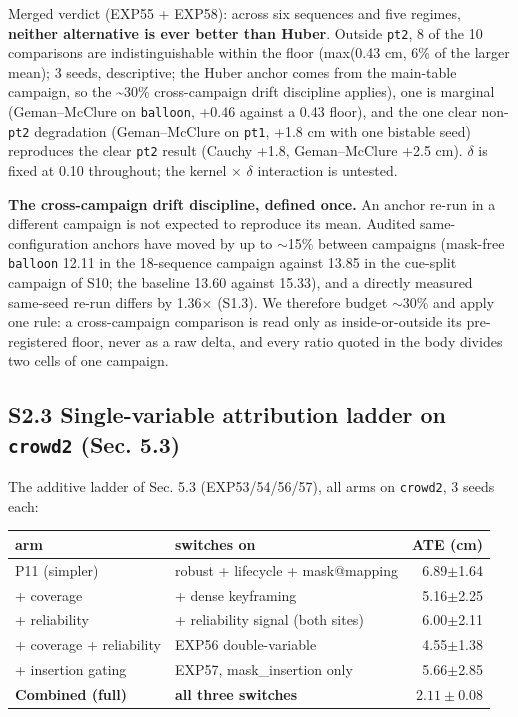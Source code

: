 Merged verdict (EXP55 + EXP58): across six sequences and five regimes, \textbf{neither alternative is ever better than Huber}. Outside \texttt{pt2}, 8 of the 10 comparisons are indistinguishable within the floor (max(0.43 cm, 6\% of the larger mean); 3 seeds, descriptive; the Huber anchor comes from the main-table campaign, so the \textasciitilde{}30\% cross-campaign drift discipline applies), one is marginal (Geman--McClure on \texttt{balloon}, +0.46 against a 0.43 floor), and the one clear non-\texttt{pt2} degradation (Geman--McClure on \texttt{pt1}, +1.8 cm with one bistable seed) reproduces the clear \texttt{pt2} result (Cauchy +1.8, Geman--McClure +2.5 cm). $\delta$ is fixed at 0.10 throughout; the kernel $\times$ $\delta$ interaction is untested.

\textbf{The cross-campaign drift discipline, defined once.} An anchor re-run in a different campaign is not expected to reproduce its mean. Audited same-configuration anchors have moved by up to $\sim$15\% between campaigns (mask-free \texttt{balloon} 12.11 in the 18-sequence campaign against 13.85 in the cue-split campaign of S10; the  baseline 13.60 against 15.33), and a directly measured same-seed re-run differs by 1.36$\times$ (S1.3). We therefore budget $\sim$30\% and apply one rule: a cross-campaign comparison is read only as inside-or-outside its pre-registered floor, never as a raw delta, and every ratio quoted in the body divides two cells of one campaign.


\subsection{S2.3 Single-variable attribution ladder on \texttt{crowd2} (Sec. 5.3)}


The additive ladder of Sec. 5.3 (EXP53/54/56/57), all arms on \texttt{crowd2}, 3 seeds each:


\begin{table}[t]\centering\footnotesize
\begin{tabular}{llr}\toprule
arm & switches on & ATE (cm) \\ \midrule
P11 (simpler) & robust + lifecycle + mask@mapping & 6.89$\pm$1.64 \\
+ coverage & + dense keyframing & 5.16$\pm$2.25 \\
+ reliability & + reliability signal (both sites) & 6.00$\pm$2.11 \\
+ coverage + reliability & EXP56 double-variable & 4.55$\pm$1.38 \\
+ insertion gating & EXP57, mask\_insertion only & 5.66$\pm$2.85 \\
\textbf{Combined (full)} & \textbf{all three switches} & {\boldmath$2.11\pm0.08$} \\
\bottomrule\end{tabular}\end{table}

